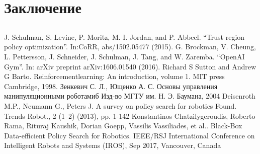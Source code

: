 \documentclass[a4paper,12pt]{article}
\begin{document}
\section{Заключение}
\subsection{}
\newpage
\begin{thebibliography}{9}
       J. Schulman, S. Levine, P. Moritz, M. I. Jordan, and P. Abbeel. “Trust region policy optimization”. In:CoRR, abs/1502.05477 (2015).
     G. Brockman, V. Cheung, L. Pettersson, J. Schneider, J. Schulman, J. Tang, and W. Zaremba. “OpenAI Gym”. In: arXiv preprint arXiv:1606.01540 (2016).
     Richard S Sutton and Andrew G Barto. Reinforcementlearning: An introduction, volume 1. MIT press Cambridge, 1998.
     Зенкевич С. Л., Ющенко А. С. Основы управления манипуляционными роботамиб Изд-во МГТУ им. Н. Э. Баумана, 2004
     Deisenroth M.P., Neumann G., Peters J. A survey on policy search for robotics Found. Trends Robot., 2 (1–2) (2013), pp. 1-142
     Konstantinos Chatzilygeroudis, Roberto Rama, Rituraj Kaushik, Dorian Goepp, Vassilis Vassiliades, et al.. Black-Box Data-efficient Policy Search for Robotics. IEEE/RSJ International Conference on Intelligent Robots and Systems (IROS), Sep 2017, Vancouver, Canada

\end{thebibliography}
\end{document}
